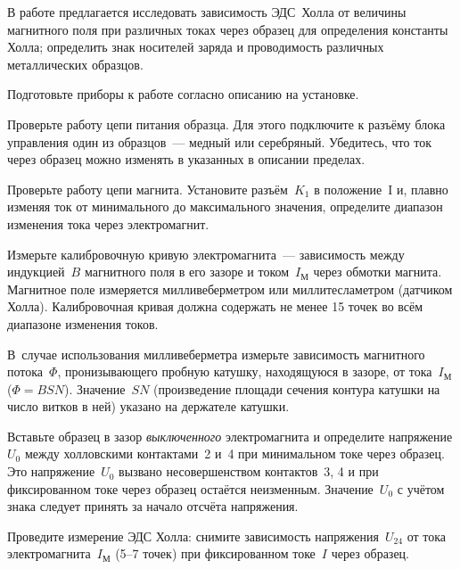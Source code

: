 \labtask

В работе предлагается исследовать зависимость ЭДС~Холла от величины магнитного
поля при различных токах через образец для определения константы Холла;
определить знак носителей заряда и проводимость различных металлических
образцов.

\begin{lab:task}

\item Подготовьте приборы к работе согласно описанию на установке.

\item Проверьте работу цепи питания образца. Для этого подключите к разъёму
блока управления один из образцов~--- медный или серебряный. Убедитесь, что ток
через образец можно изменять в указанных в описании пределах.

\item Проверьте работу цепи магнита. Установите разъём~$K_1$ в положение~I и,
плавно изменяя ток от минимального до максимального значения, 
определите диапазон изменения тока через электромагнит.

\item Измерьте калибровочную кривую электромагнита~---
зависимость между индукцией~$B$ магнитного поля в его зазоре и 
током~$I_{М}$ через обмотки магнита.
Магнитное поле измеряется милливеберметром или миллитесламетром
(датчиком Холла). Калибровочная кривая должна содержать не менее
15 точек во всём диапазоне изменения токов.

В~случае использования милливеберметра измерьте зависимость 
магнитного потока~$\Phi$, пронизывающего пробную катушку, 
находящуюся в зазоре, от тока~$I_{М}$ ($\Phi=BSN$). 
Значение~$SN$ (произведение площади сечения контура катушки на
число витков в ней) указано на держателе катушки.

\item \label{p1} Вставьте образец в зазор \emph{выключенного} электромагнита 
и определите напряжение $U_0$ между холловскими
контактами~2 и~4 при минимальном токе через образец. 
Это напряжение~$U_0$ вызвано несовершенством контактов~3, 4 и при 
фиксированном токе через образец остаётся неизменным. Значение~$U_0$ с учётом 
знака следует принять за начало отсчёта напряжения.

\item \label{p2} Проведите измерение ЭДС Холла: снимите зависимость 
напряжения~$U_{24}$ от тока электромагнита~$I_{М}$ (5--7 точек) 
при фиксированном токе~$I$ через образец.


\end{lab:task}
